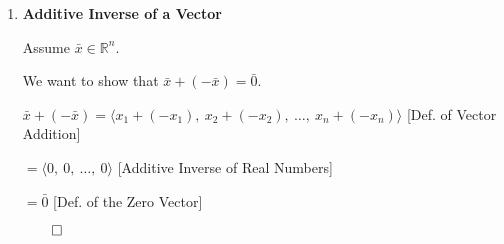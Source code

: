 \begin{proofbox}
\begin{enumerate}[label=\arabic*., resume=vecprops]
\quad $\bar{x} + \bar{0} = \langle x_1 + 0,\ x_2 + 0,\ \ldots,\ x_n + 0 \rangle$ \hfill [Def. of Vector Addition]

\quad $= \langle x_1,\ x_2,\ \ldots,\ x_n \rangle$ \hfill [Identity Property of Real Numbers]

\quad $= \bar{x}$ \hfill [Def. of Vector Equality]

\hfill $\qed$

\item \textbf{Additive Inverse of a Vector} 
 
Assume $\bar{x} \in \mathbb{R}^n$. 

We want to show that $\bar{x} + (-\bar{x}) = \bar{0}$.

\quad $\bar{x} + (-\bar{x}) = \langle x_1 + (-x_1),\ x_2 + (-x_2), \ \ldots, \ x_n + (-x_n) \rangle$ \hfill [Def. of Vector Addition]

\quad $= \langle 0, \ 0, \ \ldots, \ 0 \rangle$ \hfill [Additive Inverse of Real Numbers]

\quad $= \bar{0}$ \hfill [Def. of the Zero Vector]

\hfill $\qed$

\end{enumerate}
\end{proofbox}

\newpage

